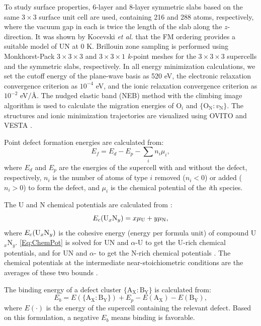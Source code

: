 \documentclass[preprint,12pt,sort&compress]{elsarticle}
\newcommand{\?}{\stackrel{?}{=}}
\begin{document}
To study surface properties, 6-layer and 8-layer symmetric slabs based on the same $3 \times 3$ surface unit cell are used, containing 216 and 288 atoms, respectively, where the vacuum gap in each is twice the length of the slab along the $z$-direction. It was shown by Kocevski \textit{et al.}
\cite{Kocevski2022I} that the FM ordering provides a suitable model of UN at 0 K. Brillouin zone sampling is performed using Monkhorst-Pack \cite{Monkhorst1976} $3 \times 3 \times 3$ and $3 \times 3 \times 1$ \textit{k}-point meshes for the $3 \times 3 \times 3$ supercells and the symmetric slabs, respectively. In all energy minimization calculations, we set the cutoff energy of the plane-wave basis as 520 eV, the electronic relaxation convergence criterion as $10^{-4}$ eV, and the ionic relaxation convergence criterion as $10^{-2}$ eV/\AA. The nudged elastic band (NEB) method \cite{Henkelman2000a} with the climbing image algorithm \cite{Henkelman2000b} is used to calculate the migration energies of O$_i$ and $\{\text{O}_\text{N} \! : \! v_\text{N}\}$. The structures and ionic minimization trajectories are visualized using OVITO \cite{Stukowski2010} and VESTA \cite{Momma2008}.


Point defect formation energies are calculated from:
\begin{equation}
E_f = E_d - E_p - \sum_i n_i \mu_i,
\end{equation}
where $E_d$ and $E_p$ are the energies of the supercell with and without the defect, respectively, $n_i$ is the number of atoms of type $i$ removed ($n_i < 0$) or added ($n_i > 0$) to form the defect, and $\mu_i$ is the chemical potential of the \textit{i}th species.

The U and N chemical potentials are calculated from \cite{AbdulHameed2024}:
\begin{equation}
E_c(\text{U}_{x}\text{N}_{y}) = x \mu_{\ce{U}} + y \mu_{\ce{N}},
\label{Eq:ChemPot}
\end{equation}
where $E_c(\ce{U$_{x}$N$_{y}$})$ is the cohesive energy (energy per formula unit) of compound U$_x$N$_y$. \cref{Eq:ChemPot} is solved for UN and $\alpha$-U to get the U-rich chemical potentials, and for UN and $\alpha$- to get the N-rich chemical potentials \cite{Huang2020, Yang2021}. The chemical potentials at the intermediate near-stoichiometric conditions are the averages of these two bounds \cite{Woodward1998}.

The binding energy of a defect cluster $\{\text{A}_\text{X} \! : \! \text{B}_\text{Y}\}$ is calculated from:
\begin{equation}
E_b = E(\{\text{A}_\text{X} \! : \! \text{B}_\text{Y}\}) + E_p - E(\text{A}_\text{X}) - E(\text{B}_\text{Y}),
\end{equation}
where $E(\cdot)$ is the energy of the supercell containing the relevant defect. Based on this formulation, a negative $E_b$ means binding is favorable.
\end{document}
